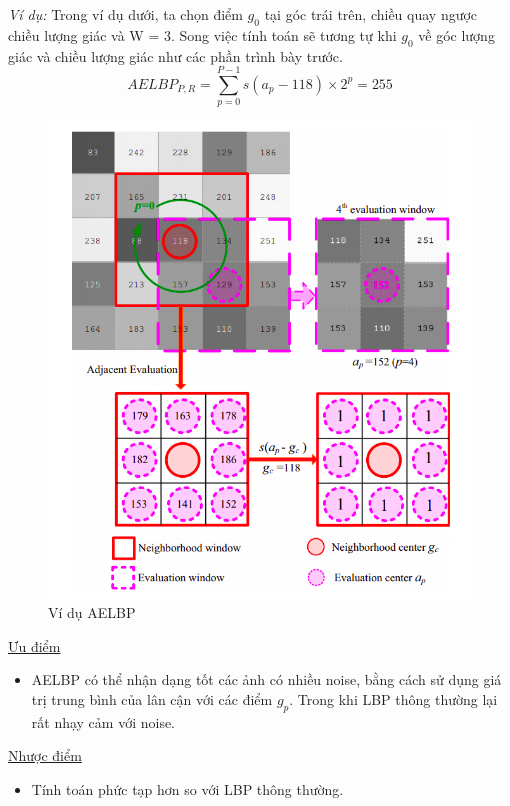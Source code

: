 \textit{Ví dụ:} Trong ví dụ dưới, ta chọn điểm $g_0$ tại góc trái trên, chiều quay ngược chiều lượng giác và W = 3. Song việc tính toán sẽ tương tự khi $g_0$ về góc lượng giác và chiều lượng giác như các phần trình bày trước.
$$
	AELBP_{P,R}=\sum_{p=0}^{P-1}{s(a_p-118)\times 2^p}=255
$$
\begin{figure}[H]
	\begin{center}
		\includegraphics[scale=0.5]{images/theo1/AELBP}
		\caption{Ví dụ AELBP}
	\end{center}
\end{figure}

\underline{Ưu điểm}
\begin{itemize}
	\item AELBP có thể nhận dạng tốt các ảnh có nhiều noise, bằng cách sử dụng giá trị trung bình của lân cận với các điểm $g_p$. Trong khi LBP thông thường lại rất nhạy cảm với noise.
\end{itemize}
\underline{Nhược điểm}
\begin{itemize}
	\item Tính toán phức tạp hơn so với LBP thông thường.
\end{itemize}
